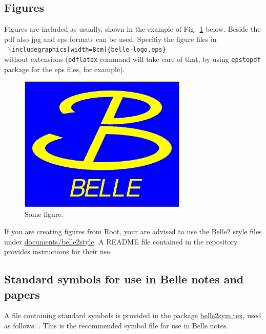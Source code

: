 \documentclass[preprint,prd,tightenlines]{revtex4}
\begin{document}
\subsection{Figures}
\label{sec:fig}

Figures are included as usually, shown in the example of Fig.~\ref{fig1} below. Beside the pdf also jpg and eps 
formats can be used. Specifiy the figure files in \\
{\tt 
$\backslash$includegraphics[width=8cm]\{belle-logo.eps\}\\
}
without extensions ({\tt pdflatex} command will take care of that, by using {\tt epstopdf} package 
for the eps files, for example). 

\begin{figure}
\begin{center}
\includegraphics[width=8cm]{belle-logo.eps}
  \caption{Some figure.}
  \label{fig1}
\end{center}
\end{figure}

If you are creating figures from Root, your are advised to use the Belle2 style files under \url{documents/belle2style}. A README file contained in the repository provides instructions for their use.

\subsection{Standard symbols for use in Belle notes and papers}
\label{sec:sym}
A file containing standard symbols is provided in the package \url{belle2sym.tex}, used as follows: \epem \ra \epemg. This is the recommended symbol file for use in Belle notes.



\end{document}
